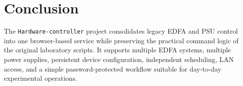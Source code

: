 \documentclass[11pt,a4paper]{article}
\begin{document}
\section{Conclusion}
The \texttt{Hardware-controller} project consolidates legacy EDFA and PSU control into one browser-based service while preserving the practical command logic of the original laboratory scripts. It supports multiple EDFA systems, multiple power supplies, persistent device configuration, independent scheduling, LAN access, and a simple password-protected workflow suitable for day-to-day experimental operations.
\end{document}
